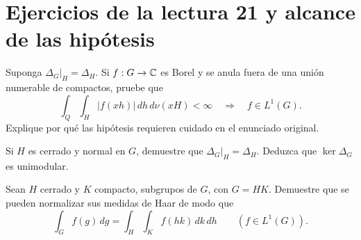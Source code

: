 \section{Ejercicios de la lectura 21 y alcance de las hipótesis}
\begin{ejercicio}\label{ej:v4-l21-1}
Suponga $\Delta_G|_H=\Delta_H$. Si $f:G\to\mathbb C$ es Borel y se anula fuera de una unión numerable de compactos, pruebe que
\[
 \int_Q\int_H|f(xh)|\,dh\,d\nu(xH)<\infty
 \quad\Longrightarrow\quad f\in L^1(G).
\]
Explique por qué las hipótesis requieren cuidado en el enunciado original.
\end{ejercicio}


\begin{ejercicio}\label{ej:v4-l21-2}
Si $H$ es cerrado y normal en $G$, demuestre que $\Delta_G|_H=\Delta_H$. Deduzca que $\ker\Delta_G$ es unimodular.
\end{ejercicio}


\begin{ejercicio}\label{ej:v4-l21-3}
Sean $H$ cerrado y $K$ compacto, subgrupos de $G$, con $G=HK$. Demuestre que se pueden normalizar sus medidas de Haar de modo que
\[
 \int_Gf(g)\,dg=\int_H\int_K f(hk)\,dk\,dh
 \qquad(f\in L^1(G)).
\]
\end{ejercicio}
